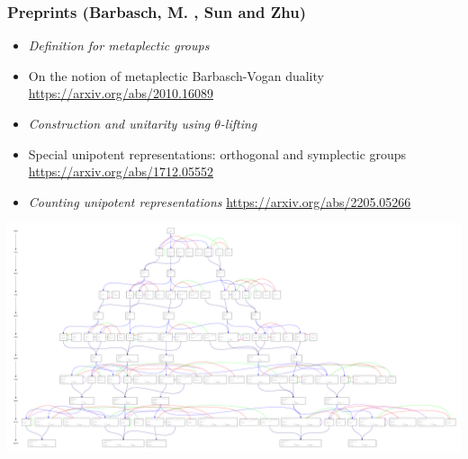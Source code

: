 \documentclass[t,11pt,usenames,dvipsnames]{beamer}
\theoremstyle{plain}
\theoremstyle{definition}
\def\blue{\color{blue}}
\let\oldemph\emph
\def\emph#1{\oldemph{\blue #1}}
\begin{document}
    \begin{frame}
      \frametitle{Preprints (Barbasch, M. ,  Sun and  Zhu)}
        \vfill
        \begin{itemize}
          \item \emph{Definition for metaplectic groups}
          \item[]
   	On the notion of metaplectic Barbasch-Vogan duality
        \href{https://arxiv.org/abs/2010.16089}{https://arxiv.org/abs/2010.16089}
          \item \emph{Construction and unitarity using $\theta$-lifting}
          \item[]
        Special unipotent representations: orthogonal and symplectic groups\\
        \href{https://arxiv.org/abs/1712.05552}{https://arxiv.org/abs/1712.05552}
          \item \emph{Counting unipotent representations}
        \href{https://arxiv.org/abs/2205.05266}{https://arxiv.org/abs/2205.05266}
        \vfill
         \end{itemize}
    \end{frame}

    \begin{frame}{}

       \vfill
        \vfill
        \includegraphics[width=\textwidth]{lifttreeC1_10.pdf}
      \end{frame}

  
\end{document}
